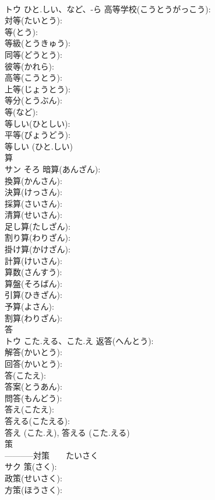 \documentclass[8pt]{extreport}
\begin{document}
\begin{CJK}{UTF8}{min}
\\	トウ	ひと.しい、など、-ら	高等学校(こうとうがっこう): 
\\	対等(たいとう): 
\\	等(とう): 
\\	等級(とうきゅう): 
\\	同等(どうとう): 
\\	彼等(かれら): 
\\	高等(こうとう): 
\\	上等(じょうとう): 
\\	等分(とうぶん): 
\\	等(など): 
\\	等しい(ひとしい): 
\\	平等(びょうどう): 
\\	等しい (ひと.しい)
\\	算			
\\	サン	そろ	暗算(あんざん): 
\\	換算(かんさん): 
\\	決算(けっさん): 
\\	採算(さいさん): 
\\	清算(せいさん): 
\\	足し算(たしざん): 
\\	割り算(わりざん): 
\\	掛け算(かけざん): 
\\	計算(けいさん): 
\\	算数(さんすう): 
\\	算盤(そろばん): 
\\	引算(ひきざん): 
\\	予算(よさん): 
\\	割算(わりざん): 
\\	答			
\\	トウ	こた.える、こた.え	返答(へんとう): 
\\	解答(かいとう): 
\\	回答(かいとう): 
\\	答(こたえ): 
\\	答案(とうあん): 
\\	問答(もんどう): 
\\	答え(こたえ): 
\\	答える(こたえる): 
\\	答え (こた.え), 答える (こた.える)
\\	策			
\\	-----------対策　　たいさく　　
\\	サク		策(さく): 
\\	政策(せいさく): 
\\	方策(ほうさく): 

\end{CJK}
\end{document}
